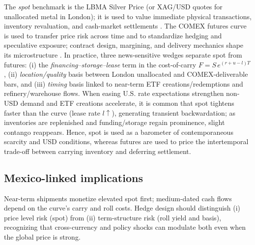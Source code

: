 \documentclass[10pt,a4paper]{article} %
\begin{document}
The \emph{spot} benchmark is the LBMA Silver Price (or XAG/USD quotes for unallocated metal in London); it is used to value immediate physical transactions, inventory revaluation, and cash-market settlements \citep{lbma_prices}. The COMEX futures curve is used to transfer price risk across time and to standardize hedging and speculative exposure; contract design, margining, and delivery mechanics shape its microstructure \citep{cme_silver_overview}. In practice, three news-sensitive wedges separate spot from futures: (i) the \emph{financing–storage–lease} term in the cost-of-carry \(F=S\,e^{(r+u-l)T}\), (ii) \emph{location/quality} basis between London unallocated and COMEX-deliverable bars, and (iii) \emph{timing} basis linked to near-term ETF creations/redemptions and refinery/warehouse flows. When easing U.S. rate expectations strengthen non-USD demand and ETF creations accelerate, it is common that spot tightens faster than the curve (lease rate \(l\uparrow\)), generating transient backwardation; as inventories are replenished and funding/storage regain prominence, slight contango reappears. Hence, spot is used as a barometer of contemporaneous scarcity and USD conditions, whereas futures are used to price the intertemporal trade-off between carrying inventory and deferring settlement.

\subsection{Mexico-linked implications}
Near-term shipments monetize elevated spot first; medium-dated cash flows depend on the curve’s carry and roll costs. Hedge design should distinguish (i) price level risk (spot) from (ii) term-structure risk (roll yield and basis), recognizing that cross-currency and policy shocks can modulate both even when the global price is strong.
\end{document}
